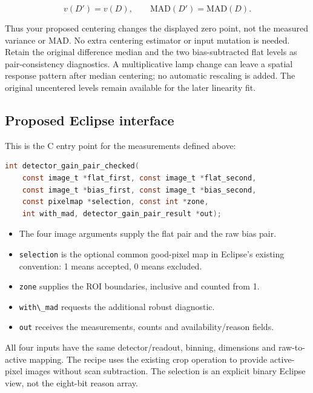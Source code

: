 \documentclass[
  10pt,
  a4paper,
]{article}
\newcommand{\passthrough}[1]{#1}
\providecommand{\tightlist}{%
  \setlength{\itemsep}{0pt}\setlength{\parskip}{0pt}}
\begin{document}
\[
v(D')=v(D),
\qquad
\mathrm{MAD}(D')=\mathrm{MAD}(D).
\]

Thus your proposed centering changes the displayed zero point, not the
measured variance or MAD. No extra centering estimator or input mutation
is needed. Retain the original difference median and the two
bias-subtracted flat levels as pair-consistency diagnostics. A
multiplicative lamp change can leave a spatial response pattern after
median centering; no automatic rescaling is added. The original
uncentered levels remain available for the later linearity fit.

\hypertarget{proposed-eclipse-interface}{%
\subsection{Proposed Eclipse
interface}\label{proposed-eclipse-interface}}

This is the C entry point for the measurements defined above:

\begin{lstlisting}[language=C]
int detector_gain_pair_checked(
    const image_t *flat_first, const image_t *flat_second,
    const image_t *bias_first, const image_t *bias_second,
    const pixelmap *selection, const int *zone,
    int with_mad, detector_gain_pair_result *out);
\end{lstlisting}

\begin{itemize}
\tightlist
\item
  The four image arguments supply the flat pair and the raw bias pair.
\item
  \passthrough{\lstinline!selection!} is the optional common good-pixel
  map in Eclipse's existing convention: 1 means accepted, 0 means
  excluded.
\item
  \passthrough{\lstinline!zone!} supplies the ROI boundaries, inclusive
  and counted from 1.
\item
  \passthrough{\lstinline!with\_mad!} requests the additional robust
  diagnostic.
\item
  \passthrough{\lstinline!out!} receives the measurements, counts and
  availability/reason fields.
\end{itemize}

All four inputs have the same detector/readout, binning, dimensions and
raw-to-active mapping. The recipe uses the existing crop operation to
provide active-pixel images without scan subtraction. The selection is
an explicit binary Eclipse view, not the eight-bit reason array.
\end{document}
